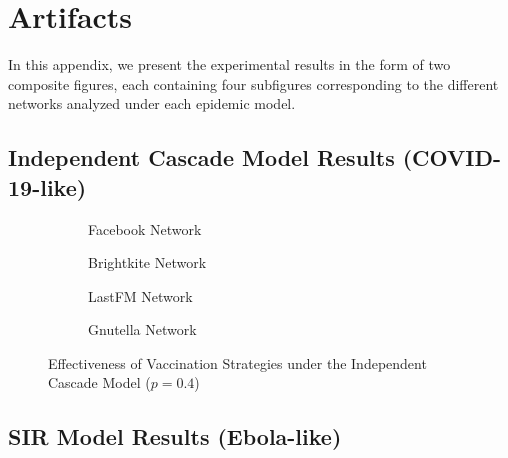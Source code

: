 \documentclass[9pt]{extarticle}
\begin{document}
\pagebreak

\appendix

\section{Artifacts}
\label{sec:artifacts}

In this appendix, we present the experimental results in the form of two composite figures, each containing four subfigures corresponding to the different networks analyzed under each epidemic model.

\subsection{Independent Cascade Model Results (COVID-19-like)}

\begin{figure}[H]
    \centering
    \begin{subfigure}{0.45\linewidth}
        \resizebox{\linewidth}{!}{}
        \caption{Facebook Network}
        \label{fig:facebook_ic}
    \end{subfigure}
    \hfill
    \begin{subfigure}{0.45\linewidth}
        \resizebox{\linewidth}{!}{}
        \caption{Brightkite Network}
        \label{fig:brightkite_ic}
    \end{subfigure}

    \vspace{0.5cm}

    \begin{subfigure}{0.45\linewidth}
        \resizebox{\linewidth}{!}{}
        \caption{LastFM Network}
        \label{fig:lastfm_ic}
    \end{subfigure}
    \hfill
    \begin{subfigure}{0.45\linewidth}
        \resizebox{\linewidth}{!}{}
        \caption{Gnutella Network}
        \label{fig:gnutella_ic}
    \end{subfigure}
    \caption{Effectiveness of Vaccination Strategies under the Independent Cascade Model ($p = 0.4$)}
    \label{fig:ic_results}
\end{figure}

\subsection{SIR Model Results (Ebola-like)}
\end{document}
